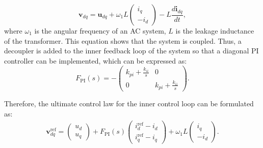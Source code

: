 \documentclass[conference]{IEEEtran}
\begin{document}
\begin{equation}
\label{eq:voltage}
\mathbf{v}_{dq}=\mathbf{u}_{dq}+\omega_1 L\begin{pmatrix}
i_{q} \\ -i_d
\end{pmatrix}-L\frac{d \mathbf{i}_{dq}}{dt},
\end{equation}
where $\omega_1$ is the angular frequency of an AC system, $L$ is the leakage inductance of the transformer. This equation shows that the system is coupled. Thus, a decoupler is added to the inner feedback loop of the system so that a diagonal PI controller can be implemented, which can be expressed as:
\begin{equation}
\label{eq:PI}
F_{\text{PI}}(s)=-\begin{pmatrix}
k_{pi}+{\frac{\displaystyle k_{ii}}{s}} & 0 \\ 
0 & k_{pi}+{\frac{\displaystyle k_{ii}}{s}}
\end{pmatrix} .
\end{equation}

Therefore, the ultimate control law for the inner control loop
can be formulated as:
\begin{equation}
\begin{split}
\label{eq:finalcontrol_proportional}
\mathbf{v}_{dq}^{\text{ref}}=\begin{pmatrix}
u_d \\ u_q
\end{pmatrix}+F_{\text{PI}}(s)\begin{pmatrix}
  i_{d}^{\text{ref}}-i_{d} \\ i_{q}^{\text{ref}}-i_{q}
\end{pmatrix}  +\omega_1 L\begin{pmatrix}
i_{q} \\ -i_d
\end{pmatrix}.
\end{split}
\end{equation}

\end{document}
